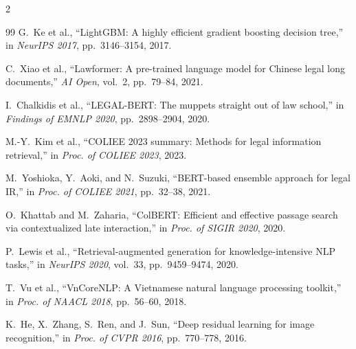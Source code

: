 \documentclass[12pt,a4paper]{article}
\begin{document}
\begin{multicols}{2}
\begin{thebibliography}{99}
G.~Ke et al., ``LightGBM: A highly efficient gradient boosting decision tree,'' in \textit{NeurIPS 2017}, pp.~3146--3154, 2017.

C.~Xiao et al., ``Lawformer: A pre-trained language model for Chinese legal long documents,'' \textit{AI Open}, vol.~2, pp.~79--84, 2021.

I.~Chalkidis et al., ``LEGAL-BERT: The muppets straight out of law school,'' in \textit{Findings of EMNLP 2020}, pp.~2898--2904, 2020.

M.-Y.~Kim et al., ``COLIEE 2023 summary: Methods for legal information retrieval,'' in \textit{Proc. of COLIEE 2023}, 2023.

M.~Yoshioka, Y.~Aoki, and N.~Suzuki, ``BERT-based ensemble approach for legal IR,'' in \textit{Proc. of COLIEE 2021}, pp.~32--38, 2021.

O.~Khattab and M.~Zaharia, ``ColBERT: Efficient and effective passage search via contextualized late interaction,'' in \textit{Proc. of SIGIR 2020}, 2020.

P.~Lewis et al., ``Retrieval-augmented generation for knowledge-intensive NLP tasks,'' in \textit{NeurIPS 2020}, vol.~33, pp.~9459--9474, 2020.

T.~Vu et al., ``VnCoreNLP: A Vietnamese natural language processing toolkit,'' in \textit{Proc. of NAACL 2018}, pp.~56--60, 2018.

K.~He, X.~Zhang, S.~Ren, and J.~Sun, ``Deep residual learning for image recognition,'' in \textit{Proc. of CVPR 2016}, pp.~770--778, 2016.

\end{thebibliography}
\end{multicols}
\endgroup
\end{document}
